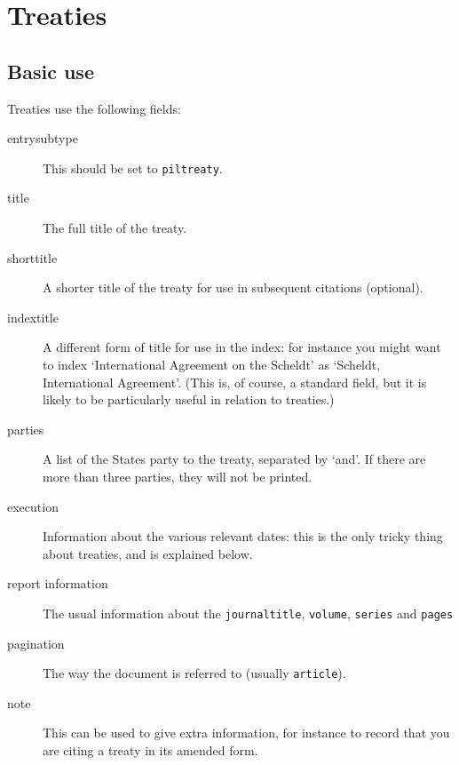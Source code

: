 \documentclass[a4paper,
               11pt,
	       DIV=1,			   
	       footinclude=false]
	      {scrartcl}
\begin{document}
\section{Treaties\label{piltreaties}}

\subsection{Basic use}

Treaties use the following fields:
\begin{description}
\item[entrysubtype]
This should be set to \texttt{piltreaty}.
\item[title] 
The full title of the treaty.
\item[shorttitle] 
A shorter title of the treaty for use in subsequent
  citations (optional).
\item[indextitle]
  A different form of title for use in the index: for
  instance you might want to index `International Agreement on the
  Scheldt' as `Scheldt, International Agreement'. (This is, of course, a standard field, but it is likely to be particularly useful in relation to treaties.)
\item[parties]
  A list of the States party to the treaty, separated by
  `and'. If there are more than three parties, they will not be
  printed.
\item[execution]
  Information about the various relevant dates: this is
  the only tricky thing about treaties, and is explained below.
\item[\textrm{report information}] The usual information about the
  \texttt{journaltitle}, \texttt{volume}, \texttt{series} and
  \texttt{pages}
\item[pagination] The way the document is referred to (usually
  \texttt{article}).
\item[note]
  This can be used to give extra information, for instance
  to record that you are citing a treaty in its amended form.
\end{description}
\end{document}

